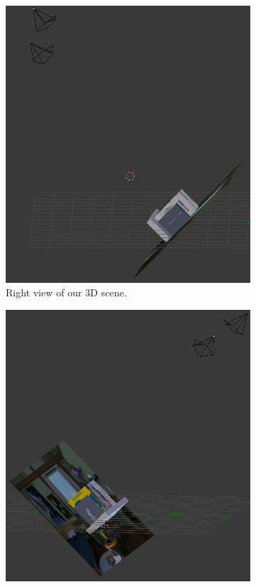 \documentclass[12pt]{article}
\begin{document}
\begin{figure}[htbp]
        \centering
        \begin{subfigure}[b]{0.35\textwidth}
                \includegraphics[width=\textwidth]{images/blender3}
                \caption{Right view of our 3D scene.}
                \label{fig:blender1}
        \end{subfigure}
        \begin{subfigure}[b]{0.35\textwidth}
                \includegraphics[width=\textwidth]{images/blender6}

\end{subfigure}
\end{figure}
\end{document}
